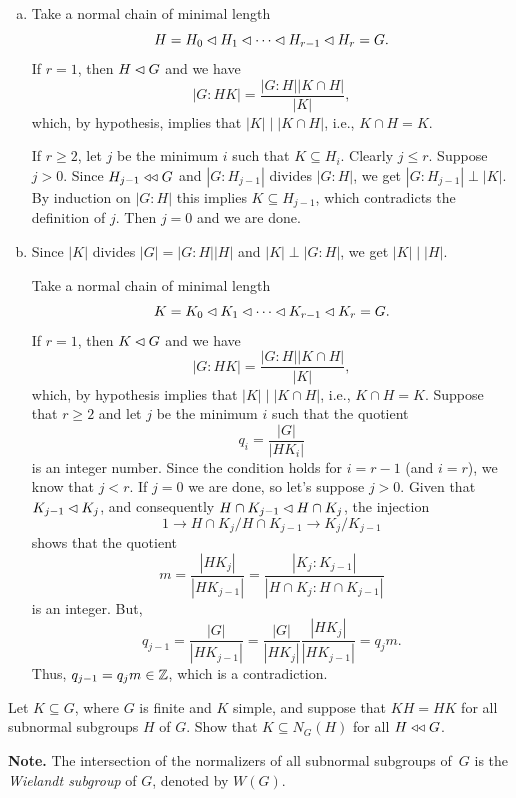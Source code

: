 \begin{solution} 

\begin{enumerate}[a),font=\upshape]
    \item Take a normal chain of minimal length
    $$
        H=H_0\lhd H_1\lhd\cdots\lhd H_{r-1}\lhd H_r=G.
    $$
    If $r=1$, then $H\lhd G$ and we have
    $$
        |G:HK| = \frac{|G:H||K\cap H|}{|K|},
    $$
    which, by hypothesis, implies that $|K|\mid|K\cap H|$, i.e., $K\cap H=K$.

    If $r\ge 2$, let $j$ be the minimum $i$ such that $K\subseteq H_i$. Clearly $j\le r$. Suppose $j>0$. Since $H_{j-1}\mathrel{\triangleleft\triangleleft} G$ and $|G:H_{j-1}|$ divides $|G:H|$, we get $|G:H_{j-1}|\perp|K|$. By induction on $|G:H|$ this implies $K\subseteq H_{j-1}$, which contradicts the definition of $j$. Then $j=0$ and we are done.

    \item Since $|K|$ divides $|G|=|G : H||H|$ and $|K|\perp|G:H|$, we get $|K|\mid|H|$.

    Take a normal chain of minimal length
    $$
        K=K_0\lhd K_1\lhd\cdots\lhd K_{r-1}\lhd K_r=G.
    $$
    If $r=1$, then $K\lhd G$ and we have
    $$
        |G:HK| = \frac{|G:H||K\cap H|}{|K|},
    $$
    which, by hypothesis implies that $|K|\mid|K\cap H|$, i.e., $K\cap H=K$. Suppose that $r\ge2$ and let $j$ be the minimum $i$ such that the quotient
    $$
        q_i=\frac{|G|}{|HK_i|}
    $$
    is an integer number. Since the condition holds for $i=r-1$ (and $i=r$), we know that $j<r$. If $j=0$ we are done, so let's suppose $j>0$. Given that $K_{j-1}\lhd K_j$, and consequently $H\cap K_{j-1}\lhd H\cap K_j$, the injection
    $$
        1\to H\cap K_j/H\cap K_{j-1}\to K_j/K_{j-1} 
    $$
    shows that the quotient
    $$
        m=\frac{|HK_j|}{|HK_{j-1}|}=\frac{|K_j:K_{j-1}|}{|H\cap K_j:H\cap K_{j-1}|}
    $$
    is an integer. But,
    $$
        q_{j-1}=\frac{|G|}{|HK_{j-1}|} = \frac{|G|}{|HK_j|}\frac{|HK_j|}{|HK_{j-1}|}
            =q_jm.
    $$
    Thus, $q_{j-1}=q_jm\in\mathbb{Z}$, which is a contradiction.
\end{enumerate}
\end{solution}

\begin{probl}
    Let\/ $K \subseteq G$, where\/ $G$ is finite and\/ $K$ simple, and suppose that\/ $KH=HK$ for all subnormal subgroups\/ $H$ of\/ $G$. Show that\/ $K \subseteq N_G(H)$ for all\/ $H \mathrel{\triangleleft\triangleleft} G$.

    \textrm{\upshape\textbf{Note.} The intersection of the normalizers of all subnormal subgroups of\/~$G$ is the \textsl{Wielandt subgroup\/} of $G$, denoted by $W(G)$.}
\end{probl}


